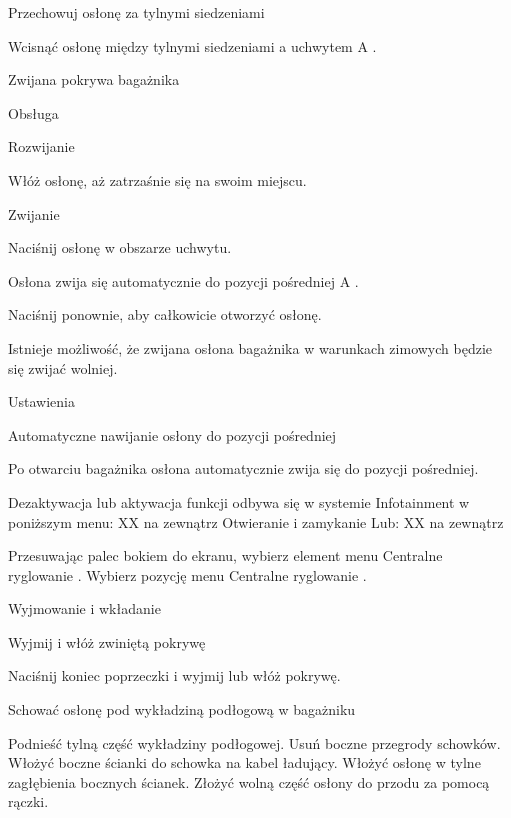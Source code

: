 Przechowuj osłonę za tylnymi siedzeniami
\begin{itemizeArrow}
	\itemArrow Wcisnąć osłonę między tylnymi siedzeniami a uchwytem A .
\end{itemizeArrow}

Zwijana pokrywa bagażnika

Obsługa

Rozwijanie
\begin{itemizeArrow}
	\itemArrow Włóż osłonę, aż zatrzaśnie się na swoim miejscu.
\end{itemizeArrow}

Zwijanie
\begin{itemizeArrow}
	\itemArrow Naciśnij osłonę w obszarze uchwytu.
\end{itemizeArrow}

Osłona zwija się automatycznie do pozycji pośredniej A .

Naciśnij ponownie, aby całkowicie otworzyć osłonę.

Istnieje możliwość, że zwijana osłona bagażnika w warunkach zimowych będzie się zwijać wolniej.


Ustawienia

Automatyczne nawijanie osłony do pozycji pośredniej

Po otwarciu bagażnika osłona automatycznie zwija się do pozycji pośredniej.

Dezaktywacja lub aktywacja funkcji odbywa się w systemie Infotainment w poniższym menu:
XX na zewnątrz Otwieranie i zamykanie
Lub:
XX na zewnątrz
\begin{itemizeArrow}
	\itemArrow Przesuwając palec bokiem do ekranu, wybierz element menu Centralne ryglowanie .
	\itemArrow Wybierz pozycję menu Centralne ryglowanie .
\end{itemizeArrow}

Wyjmowanie i wkładanie

Wyjmij i włóż zwiniętą pokrywę

\begin{itemizeArrow}
	\itemArrow Naciśnij koniec poprzeczki i wyjmij lub włóż pokrywę.
\end{itemizeArrow}

Schować osłonę pod wykładziną podłogową w bagażniku
\begin{itemizeArrow}
	\itemArrow Podnieść tylną część wykładziny podłogowej.
	\itemArrow Usuń boczne przegrody schowków.
	\itemArrow Włożyć boczne ścianki do schowka na kabel ładujący.
	\itemArrow Włożyć osłonę w tylne zagłębienia bocznych ścianek.
	\itemArrow Złożyć wolną część osłony do przodu za pomocą rączki.
\end{itemizeArrow}


